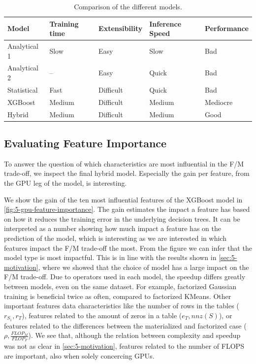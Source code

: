 \begin{table}[ht]
    \centering
    \begin{tabular}{lllll}
        \toprule
        Model        & Training time & Extensibility & Inference Speed & Performance \\
        \midrule
        Analytical 1 & Slow          & Easy          & Slow            & Bad         \\
        Analytical 2 & --            & Easy          & Quick           & Bad         \\
        Statistical  & Fast          & Difficult     & Quick           & Bad         \\
        XGBoost      & Medium        & Difficult     & Medium          & Mediocre    \\
        Hybrid       & Medium        & Difficult     & Medium          & Good        \\
        \bottomrule
    \end{tabular}
    \caption{Comparison of the different models.}
    \label{tab:5-meta-results}
\end{table}

\subsection{Evaluating Feature Importance}
\label{subsec:6-feature-importance}
To answer the question of which characteristics are most influential in the F/M trade-off, we inspect the final hybrid model. Especially the gain per feature, from the GPU leg of the model, is interesting.

We show the gain of the ten most influential features of the XGBoost model in \autoref{fig:5-gpu-feature-importance}. The gain estimates the impact a feature has based on how it reduces the training error in the underlying decision trees. It can be interpreted as a number showing how much impact a feature has on the prediction of the model, which is interesting as we are interested in which features impact the F/M trade-off the most. From the figure we can infer that the model type is most impactful. This is in line with the results shown in \autoref{sec:5-motivation}, where we showed that the choice of model has a large impact on the F/M trade-off. Due to operators used in each model, the speedup differs greatly between models, even on the same dataset. For example, factorized Gaussian training is beneficial twice as often, compared to factorized KMeans. Other important features data characteristics like the number of rows in the tables ($r_{S_1}, r_T$), features related to the amount of zeros in a table ($e_T, nnz(S)$), or features related to the differences between the materialized and factorized case ($\rho, \frac{FLOP_M}{FLOP_F}$). We see that, although the relation between complexity and speedup was not as clear in \autoref{sec:5-motivation}, features related to the number of FLOPS are important, also when solely concercing GPUs.


